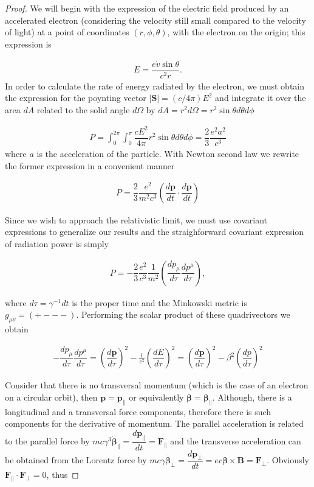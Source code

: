 \begin{proof}
We will begin with the expression of the electric field produced by an accelerated electron (considering the velocity still small compared to the velocity of light) at a point of coordinates $(r,\phi,\theta)$, with the electron on the origin; this expression is

\begin{align*}
E = \dfrac{e\dot{v}\sin \theta}{c^2 r}.
\end{align*}
In order to calculate the rate of energy radiated by the electron, we must obtain the expression for the poynting vector $|\mathbf{S}| = (c/4\pi)E^2$ and integrate it over the area $dA$ related to the solid angle $d\Omega$ by $dA = r^2d\Omega = r^2\sin\theta d\theta d\phi$

\begin{align*}
P = \int_{0}^{2\pi}\int_{0}^{\pi}\dfrac{cE^2}{4\pi}r^2\sin\theta d\theta d\phi = \dfrac{2}{3}\dfrac{e^2a^{2}}{c^3}
\end{align*}
where $a$ is the acceleration of the particle. With Newton second law we rewrite the former expression in a convenient manner

\begin{align*}
P = \dfrac{2}{3}\dfrac{e^2}{m^2c^3} \left(\dfrac{d\mathbf{p}}{dt}\cdot\dfrac{d\mathbf{p}}{dt}\right)
\end{align*}

Since we wish to approach the relativistic limit, we must use covariant expressions to generalize our results and the straighforward covariant expression of radiation power is simply

\begin{align*}
P = -\dfrac{2}{3}\dfrac{e^2}{c^3} \dfrac{1}{m^2} \left(\dfrac{d{p_\mu}}{d\tau}\dfrac{dp^\mu}{d\tau}\right),
\end{align*}

where $d\tau = \gamma^{-1}dt$ is the proper time and the Minkowski metric is $g_{\mu \nu} = (+ - - -)$. Performing the scalar product of these quadrivectors we obtain

\begin{align*}
-\dfrac{d{p_\mu}}{d\tau}\dfrac{dp^\mu}{d\tau} = \left(\dfrac{d\mathbf{p}}{d\tau}\right)^2 - \frac{1}{c^2}\left(\dfrac{dE}{d\tau}\right)^2 = \left(\dfrac{d\mathbf{p}}{d\tau}\right)^2 - \beta^2\left(\dfrac{dp}{d\tau}\right)^2
\end{align*}

Consider that there is no transversal momentum (which is the case of an electron on a circular orbit), then $\boldsymbol{{p}} = \boldsymbol{p}_\parallel$ or equivalently $\boldsymbol{\beta} = \boldsymbol{\beta_\parallel}$. Although, there is a longitudinal and a transversal force components, therefore
 there is such components for the derivative of momentum. The parallel acceleration is related to the parallel force by $mc\gamma^3\boldsymbol{\dot{\beta}}_\parallel = \dfrac{d\mathbf{p}_\parallel}{dt} = \mathbf{F}_\parallel$ and the transverse acceleration can be obtained from the Lorentz force by
 $mc \gamma\boldsymbol{\dot{\beta}}_\perp = \dfrac{d\boldsymbol{p}_{\perp}}{dt} = ec\boldsymbol{{\beta}} \times \mathbf{B} = \mathbf{F}_\perp$. Obviously $\mathbf{F}_\parallel \cdot \mathbf{F}_\perp = 0$, thus


\end{proof}
